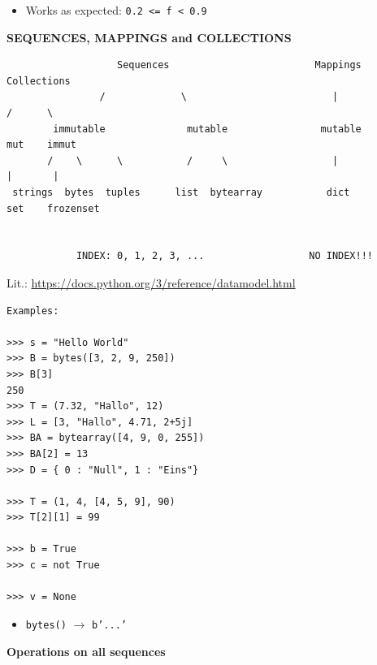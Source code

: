 \documentclass[9pt,a4wide]{extarticle}
\begin{document}
\medskip

\begin{itemize}
\item Works as expected: {\tt 0.2 <= f < 0.9}
\end{itemize}




\bigskip
{\LARGE\bf SEQUENCES, MAPPINGS and COLLECTIONS}

\begin{verbatim}
                   Sequences                         Mappings         Collections 
                /             \                         |               /      \
        immutable              mutable                mutable          mut    immut
       /    \      \           /     \                  |               |       |
 strings  bytes  tuples      list  bytearray           dict            set    frozenset


            INDEX: 0, 1, 2, 3, ...                  NO INDEX!!!
\end{verbatim}


Lit.: \url{https://docs.python.org/3/reference/datamodel.html}


\begin{verbatim}
Examples:

>>> s = "Hello World"
>>> B = bytes([3, 2, 9, 250])
>>> B[3]
250
>>> T = (7.32, "Hallo", 12)
>>> L = [3, "Hallo", 4.71, 2+5j]
>>> BA = bytearray([4, 9, 0, 255])
>>> BA[2] = 13
>>> D = { 0 : "Null", 1 : "Eins"}

>>> T = (1, 4, [4, 5, 9], 90)
>>> T[2][1] = 99

>>> b = True
>>> c = not True

>>> v = None
\end{verbatim}

\begin{itemize}
\item {\tt bytes()} $\rightarrow$ {\tt b'...'}
\end{itemize}




\bigskip
{\bf Operations on all sequences}
\end{document}
